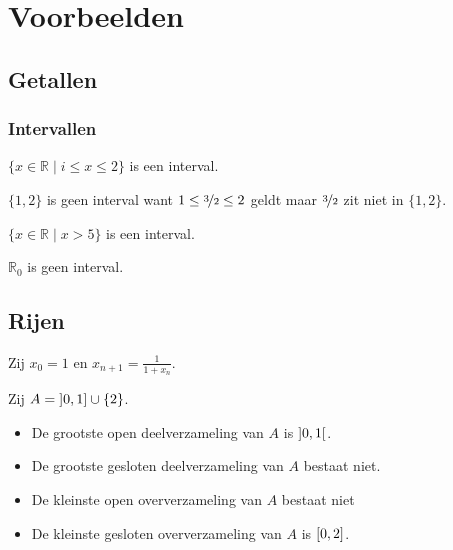 \documentclass[main.tex]{subfiles}
\begin{document}
\chapter{Voorbeelden}
\label{cha:voorbeelden}


\section{Getallen}

\subsection{Intervallen}
\begin{vb}
  $\{x\in \mathbb{R} \mid i \le x \le 2\}$ is een interval.
\end{vb}

\begin{vb}
  $\{1,2\}$ is geen interval want $1 \le \nicefrac{3}{2} \le 2$ geldt maar $\nicefrac{3}{2}$ zit niet in $\{1,2\}$.  
\end{vb}

\begin{vb}
  $\{x\in \mathbb{R} \mid x > 5\}$ is een interval.
\end{vb}

\begin{vb}
  $\mathbb{R}_{0}$ is geen interval.
\end{vb}

\section{Rijen}


\begin{vb}
  Zij $x_{0}=1$ en $x_{n+1} = \frac{1}{1+x_{n}}$.
\end{vb}

\begin{vb}
  Zij $A = \interval[open left]{0}{1} \cup \{2\} $.
  \begin{itemize}
  \item De grootste open deelverzameling van $A$ is $\interval[open]{0}{1}$.
  \item De grootste gesloten deelverzameling van $A$ bestaat niet. 
  \item De kleinste open oververzameling van $A$ bestaat niet
  \item De kleinste gesloten oververzameling van $A$ is $\interval{0}{2}$.
  \end{itemize}
\feed
\end{vb}
\end{document}
